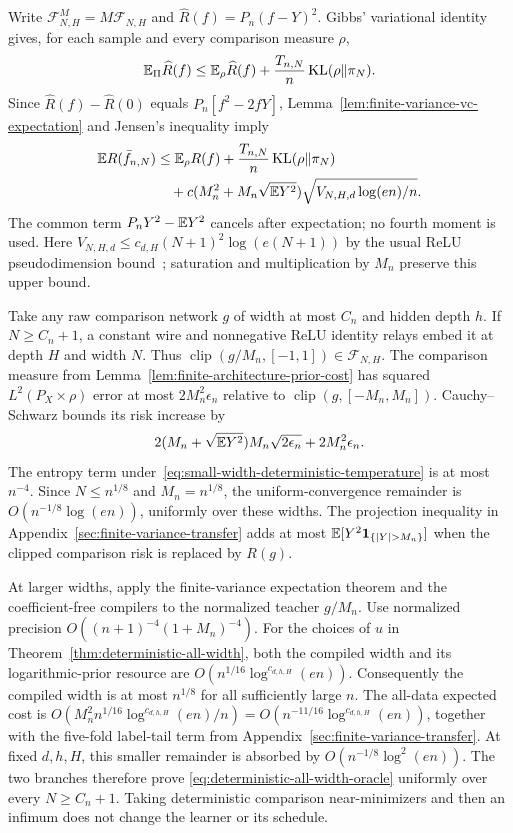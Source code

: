 Write $\mathcal F^M_{N,H}=M\mathcal F_{N,H}$ and
$\widehat R(f)=P_n(f-Y)^2$.  Gibbs' variational identity gives, for each
sample and every comparison measure $\rho$,
\[
 \mathbb E_{\Pi}\widehat R(f)
 \le \mathbb E_\rho\widehat R(f)+\frac{T_{n,N}}n\operatorname{KL}(\rho\Vert\pi_N).
\]
Since $\widehat R(f)-\widehat R(0)$ equals
$P_n[f^2-2fY]$, Lemma~\ref{lem:finite-variance-vc-expectation} and
Jensen's inequality imply
\begin{align*}
 \mathbb E R(\bar f_{n,N})
 &\le \mathbb E_\rho R(f)+\frac{T_{n,N}}n\operatorname{KL}(\rho\Vert\pi_N)\\
 &\quad+c(M_n^2+M_n\sqrt{\mathbb E Y^2})
           \sqrt{V_{N,H,d}\log(en)/n}.
\end{align*}
The common term $P_nY^2-\mathbb E Y^2$ cancels after expectation; no fourth moment is used.
Here $V_{N,H,d}\le c_{d,H}(N+1)^2\log(e(N+1))$ by the usual ReLU
pseudodimension bound~\cite{pdim}; saturation and multiplication by
$M_n$ preserve this upper bound.

Take any raw comparison network $g$ of width at most $C_n$ and hidden
depth $h$.  If $N\ge C_n+1$, a constant wire and nonnegative ReLU
identity relays embed it at depth $H$ and width $N$.
Thus $\operatorname{clip}(g/M_n,[-1,1])\in\mathcal F_{N,H}$.
The comparison measure from Lemma~\ref{lem:finite-architecture-prior-cost}
has squared $L^2(P_X\times\rho)$ error at most $2M_n^2\epsilon_n$
relative to $\operatorname{clip}(g,[-M_n,M_n])$.  Cauchy--Schwarz bounds
its risk increase by
\[
 2(M_n+\sqrt{\mathbb E Y^2})M_n\sqrt{2\epsilon_n}
       +2M_n^2\epsilon_n.
\]
The entropy term under~\eqref{eq:small-width-deterministic-temperature}
is at most $n^{-4}$.  Since $N\le n^{1/8}$ and $M_n=n^{1/8}$,
the uniform-convergence remainder is
$O(n^{-1/8}\log(en))$, uniformly over these widths.
The projection inequality in Appendix~\ref{sec:finite-variance-transfer}
adds at most $\E[Y^2\mathbf1_{\{|Y|>M_n\}}]$ when the clipped
comparison risk is replaced by $R(g)$.

At larger widths, apply the finite-variance expectation theorem and the
coefficient-free compilers to the normalized teacher $g/M_n$.
Use normalized precision $O((n+1)^{-4}(1+M_n)^{-4})$.
For the choices of $u$ in Theorem~\ref{thm:deterministic-all-width}, both
the compiled width and its logarithmic-prior resource are
$O(n^{1/16}\log^{c_{d,h,H}}(en))$.  Consequently the compiled width is
at most $n^{1/8}$ for all sufficiently large $n$.
The all-data expected cost is
$O(M_n^2n^{1/16}\log^{c_{d,h,H}}(en)/n)
=O(n^{-11/16}\log^{c_{d,h,H}}(en))$, together with the five-fold label-tail
term from Appendix~\ref{sec:finite-variance-transfer}.
At fixed $d,h,H$, this smaller remainder is absorbed by
$O(n^{-1/8}\log^2(en))$.  The two branches therefore prove
\eqref{eq:deterministic-all-width-oracle} uniformly over every
$N\ge C_n+1$.  Taking deterministic comparison near-minimizers and
then an infimum does not change the learner or its schedule.
